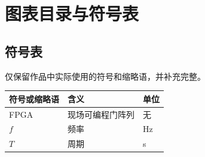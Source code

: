 ﻿\chapter{图表目录与符号表}
\appendixlists
\section{符号表}
仅保留作品中实际使用的符号和缩略语，并补充完整。
\par\noindent
\begin{tabularx}{\textwidth}{lXl}
\toprule
符号或缩略语 & 含义 & 单位 \\
\midrule
FPGA & 现场可编程门阵列 & 无 \\
$f$ & 频率 & \unit{\hertz} \\
$T$ & 周期 & \unit{\second} \\
\bottomrule
\end{tabularx}

